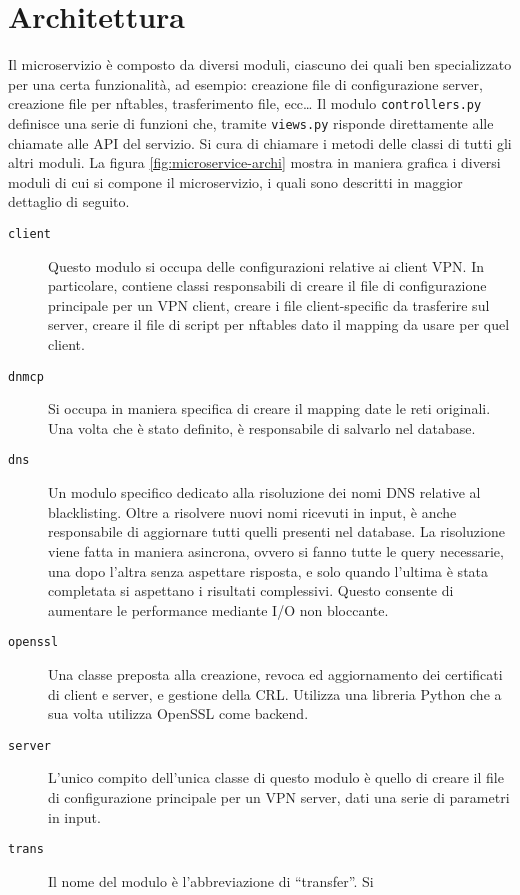 \section{Architettura}
Il microservizio è composto da diversi moduli, ciascuno dei quali ben
specializzato per una certa funzionalità, ad esempio: creazione file di configurazione
server, creazione file per nftables, trasferimento file, ecc\ldots
Il modulo \texttt{controllers.py}  definisce
una serie di funzioni che, tramite \texttt{views.py} risponde direttamente alle
chiamate alle API del servizio. Si cura di chiamare i metodi delle classi di tutti
gli altri moduli.
La figura \ref{fig:microservice-archi} mostra in maniera grafica i diversi moduli di cui
si compone il microservizio, i quali sono descritti in maggior dettaglio di seguito.

\begin{description}
  \item[\texttt{client}]Questo modulo si occupa delle configurazioni relative ai
  client VPN. In particolare, contiene classi responsabili di creare il file
  di configurazione principale per un VPN client, creare i file client-specific
  da trasferire sul server, creare il file di script per nftables dato il mapping
  da usare per quel client.
  \item[\texttt{dnmcp}]Si occupa in maniera specifica di creare il mapping date
  le reti originali. Una volta che è stato definito, è responsabile di salvarlo
  nel database.
  \item[\texttt{dns}]Un modulo specifico dedicato alla risoluzione dei nomi
  DNS relative al blacklisting. Oltre a risolvere nuovi nomi ricevuti in input,
  è anche responsabile di aggiornare tutti quelli presenti nel database.
  La risoluzione viene fatta in maniera asincrona, ovvero si fanno tutte le query
  necessarie, una dopo l'altra senza aspettare risposta, e solo quando l'ultima
  è stata completata si aspettano i risultati complessivi. Questo consente
  di aumentare le performance mediante I/O non bloccante.
  \item[\texttt{openssl}]Una classe preposta alla creazione, revoca ed aggiornamento
  dei certificati di client e server, e gestione della CRL. Utilizza una
  libreria Python che a sua volta utilizza OpenSSL come backend.
  \item[\texttt{server}]L'unico compito dell'unica classe di questo modulo è quello
  di creare il file di configurazione principale per un VPN server, dati una serie
  di parametri in input.
  \item[\texttt{trans}]Il nome del modulo è l'abbreviazione di ``transfer''. Si

\end{description}
